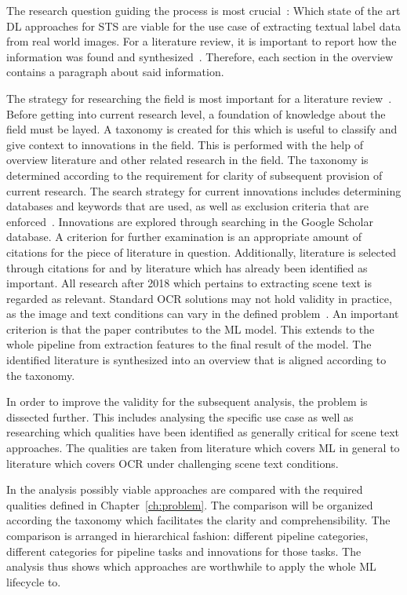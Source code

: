 The research question guiding the process is most crucial~\citep{snyder_literature_2019}:
Which state of the art \ac{DL} approaches for \ac{STS} are viable for the use case of extracting
textual label data from real world images.
For a literature review, it is important to report how the information was found and
synthesized~\citep{torraco_writing_2005}.
Therefore, each section in the overview contains a paragraph about said information.

The strategy for researching the field is most important for a literature
review~\citep{snyder_literature_2019}.
Before getting into current research level, a foundation of knowledge about the field must be layed.
A taxonomy is created for this which is useful to classify and give context to innovations in the
field.
This is performed with the help of overview literature and other related research in the field.
The taxonomy is determined according to the requirement for clarity of subsequent provision of
current research.
The search strategy for current innovations includes determining databases and keywords that are
used, as well as exclusion criteria that are enforced~\citep{torraco_writing_2005}.
Innovations are explored through searching in the Google Scholar database.
A criterion for further examination is an appropriate amount of citations for the piece of literature
in question.
Additionally, literature is selected through citations for and by literature which has already been
identified as important.
All research after 2018 which pertains to extracting scene text is regarded as relevant.
Standard \ac{OCR} solutions may not hold validity in practice, as the image and text conditions can
vary in the defined problem~\citep{chen_text_2021}.
An important criterion is that the paper contributes to the \ac{ML} model.
This extends to the whole pipeline from extraction features to the final result of the model.
The identified literature is synthesized into an overview that is aligned according to the taxonomy.

In order to improve the validity for the subsequent analysis, the problem is dissected further.
This includes analysing the specific use case as well as researching which qualities have been
identified as generally critical for scene text approaches.
The qualities are taken from literature which covers \ac{ML} in general to literature
which covers \ac{OCR} under challenging scene text conditions.

In the analysis possibly viable approaches are compared with the required qualities defined
in Chapter~\ref{ch:problem}.
The comparison will be organized according the taxonomy which facilitates the clarity and
comprehensibility.
The comparison is arranged in hierarchical fashion: different pipeline categories,
different categories for pipeline tasks and innovations for those tasks.
The analysis thus shows which approaches are worthwhile to apply the whole \ac{ML} lifecycle to.

